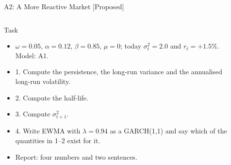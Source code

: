 \begin{frame}{A2: A More Reactive Market [Proposed]}
\propsub
\itemsize{\scriptsize}
\begin{columns}[T]
\begin{column}{\taskw}
\begin{block}{Task}
\begin{itemize}
    \item $\omega = 0.05$, $\alpha = 0.12$, $\beta = 0.85$, $\mu = 0$; today $\sigma_t^2 = 2.0$ and $r_t = +1.5\%$. Model: A1.
    \item 1. Compute the persistence, the long-run variance and the annualised long-run volatility.
    \item 2. Compute the half-life.
    \item 3. Compute $\sigma_{t+1}^2$.
    \item 4. Write EWMA with $\lambda = 0.94$ as a GARCH(1,1) and say which of the quantities in 1--2 exist for it.
    \item Report: four numbers and two sentences.
\end{itemize}
\end{block}
\end{column}
\begin{column}{\solw}
\end{column}
\end{columns}
\end{frame}

